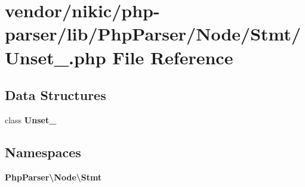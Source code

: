 \section{vendor/nikic/php-\/parser/lib/\+Php\+Parser/\+Node/\+Stmt/\+Unset\+\_\+.php File Reference}
\label{_stmt_2_unset___8php}
\subsection*{Data Structures}
\begin{DoxyCompactItemize}
\item 
class {\bf Unset\+\_\+}
\end{DoxyCompactItemize}
\subsection*{Namespaces}
\begin{DoxyCompactItemize}
\item 
 {\bf Php\+Parser\textbackslash{}\+Node\textbackslash{}\+Stmt}
\end{DoxyCompactItemize}
